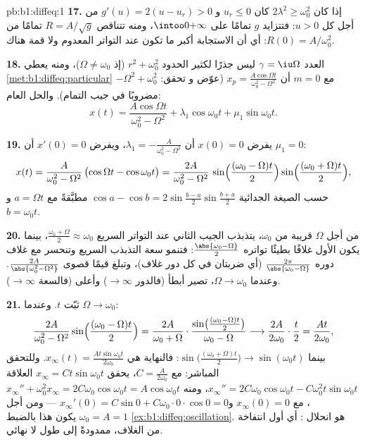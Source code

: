 \begin{solution}{pb:b1:diffeq:1}
\textbf{17.} إذا كان $2\lambda^2 \geq \omega_0^2$ كان $u_r \leq 0$ و
$g'(u) = 2(u - u_r) > 0$ من أجل كل $u > 0$: فتتزايد $g$ تمامًا
على $\intoo0{+\infty}$، ومنه تتناقص $R = A/\sqrt g$ تمامًا من
$R(0) = A/\omega_0^2$: أي أن الاستجابة أكبر ما تكون عند التواتر المعدوم
ولا قمة هناك.

\textbf{18.} العدد $\gamma = \iu\Omega$ ليس جذرًا لكثير الحدود $r^2 +
\omega_0^2$ (إذ $\Omega \neq \omega_0$)، ومنه
يعطي \cref{met:b1:diffeq:particular} مع $m = 0$ أن $x_p =
\frac{A\cos\Omega t}{\omega_0^2 - \Omega^2}$ (عوّض و
تحقق: $-\Omega^2 + \omega_0^2$ مضروبًا في جيب التمام). والحل
العام:
\[
x(t) = \frac{A\cos\Omega t}{\omega_0^2 - \Omega^2}
+ \lambda_1\cos\omega_0 t + \mu_1\sin\omega_0 t .
\]

\textbf{19.} يفرض $x(0) = 0$ أن $\lambda_1 = -\frac A{\omega_0^2 -
\Omega^2}$، ويفرض $x'(0) = 0$ أن $\mu_1 = 0$:
\[
x(t) = \frac{A}{\omega_0^2 - \Omega^2}\,
\bigl(\cos\Omega t - \cos\omega_0 t\bigr)
= \frac{2A}{\omega_0^2 - \Omega^2}\,
\sin\Bigl(\frac{(\omega_0 - \Omega)t}2\Bigr)
\sin\Bigl(\frac{(\omega_0 + \Omega)t}2\Bigr) ,
\]
حسب الصيغة الجدائية $\cos a - \cos b =
2\sin\frac{b - a}2\sin\frac{b + a}2$ مطبَّقةً مع $a = \Omega t$ و
$b = \omega_0 t$.

\textbf{20.} من أجل $\Omega$ قريبة من $\omega_0$، يتذبذب الجيب الثاني
عند التواتر السريع $\frac{\omega_0 + \Omega}2
\approx \omega_0$، بينما يكون الأول غلافًا بطيئًا تواتره
$\frac{\abs{\omega_0 - \Omega}}2$: فتنمو سعة التذبذب
السريع وتنحسر مع غلاف دوره
$\frac{2\pi}{\abs{\omega_0 - \Omega}}$ (أي ضربتان في كل دور
غلاف)، وتبلغ قيمًا قصوى $\frac{2A}{\abs{\omega_0^2 - \Omega^2}}$.
وعندما $\Omega \to \omega_0$، تصير  أبطأ (فالدور
$\to \infty$) وأعلى (فالسعة $\to \infty$).

\textbf{21.} ثبّت $t$. وعندما $\Omega \to \omega_0$:
\[
\frac{2A}{\omega_0^2 - \Omega^2}\sin\Bigl(\frac{(\omega_0 -
\Omega)t}2\Bigr)
= \frac{2A}{\omega_0 + \Omega}\cdot
\frac{\sin\bigl(\frac{(\omega_0 - \Omega)t}2\bigr)}
{\omega_0 - \Omega}
\longrightarrow \frac{2A}{2\omega_0}\cdot\frac t2
= \frac{At}{2\omega_0} ,
\]
بينما $\sin\bigl(\frac{(\omega_0 + \Omega)t}2\bigr) \to
\sin(\omega_0 t)$: فالنهاية هي $x_\infty(t) =
\frac{At\sin\omega_0 t}{2\omega_0}$. وللتحقق المباشر: مع $C =
\frac A{2\omega_0}$، يحقق $x_\infty = Ct\sin\omega_0 t$ العلاقة
$x_\infty'' = 2C\omega_0\cos\omega_0 t - C\omega_0^2 t
\sin\omega_0 t$، ومنه $x_\infty'' + \omega_0^2 x_\infty =
2C\omega_0\cos\omega_0 t = A\cos\omega_0 t$، مع $x_\infty(0) =
0$ و$x_\infty'(0) = C\sin 0 + C\omega_0 \cdot 0 \cdot \cos 0 =
0$ --- ومن أجل $\omega_0 = A = 1$ يكون هذا
بالضبط \cref{ex:b1:diffeq:oscillation}.  هو
انحلال : أي أول انتفاخة من الغلاف، ممدودةً
إلى طول لا نهائي.


\end{solution}
